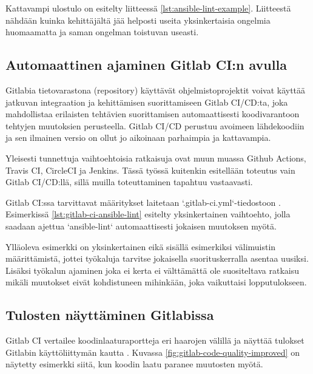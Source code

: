 Kattavampi ulostulo on esitelty liitteessä \ref{lst:ansible-lint-example}. Liitteestä
nähdään kuinka kehittäjältä jää helposti useita yksinkertaisia ongelmia huomaamatta ja
saman ongelman toistuvan useasti.

\subsection{Automaattinen ajaminen Gitlab CI:n avulla}

Gitlabia tietovarastona (repository) käyttävät ohjelmistoprojektit voivat käyttää
jatkuvan integraation ja kehittämisen suorittamiseen Gitlab CI/CD:ta, joka mahdollistaa
erilaisten tehtävien suorittamisen automaattisesti koodivarantoon tehtyjen muutoksien
perusteella. Gitlab CI/CD perustuu avoimeen lähdekoodiin ja sen ilmainen versio on ollut
jo aikoinaan parhaimpia ja kattavampia. \parencite{alma9911268330505973}

Yleisesti tunnettuja vaihtoehtoisia ratkaisuja ovat muun muassa Github Actions,
Travis CI, CircleCI ja Jenkins. Tässä työssä kuitenkin esitellään toteutus vain
Gitlab CI/CD:llä, sillä muilla toteuttaminen tapahtuu vastaavasti.

Gitlab CI:ssa tarvittavat määritykset laitetaan `.gitlab-ci.yml`-tiedostoon
\parencite{GitlabCICDDocs}. Esimerkissä \ref{lst:gitlab-ci-ansible-lint} esitelty
yksinkertainen vaihtoehto, jolla saadaan ajettua `ansible-lint` automaattisesti
jokaisen muutoksen myötä.



Ylläoleva esimerkki on yksinkertainen eikä sisällä esimerkiksi välimuistin
määrittämistä, jottei työkaluja tarvitse jokaisella suorituskerralla asentaa
uusiksi. Lisäksi työkalun ajaminen joka ei kerta ei välttämättä ole suositeltava
ratkaisu mikäli muutokset eivät kohdistuneen mihinkään, joka vaikuttaisi
lopputulokseen.

\subsection{Tulosten näyttäminen Gitlabissa}

Gitlab CI vertailee koodinlaaturaportteja eri haarojen välillä ja näyttää
tulokset Gitlabin käyttöliittymän kautta \parencite{GitlabCICDDocs}. Kuvassa
\ref{fig:gitlab-code-quality-improved} on näytetty esimerkki siitä, kun
koodin laatu paranee muutosten myötä.

